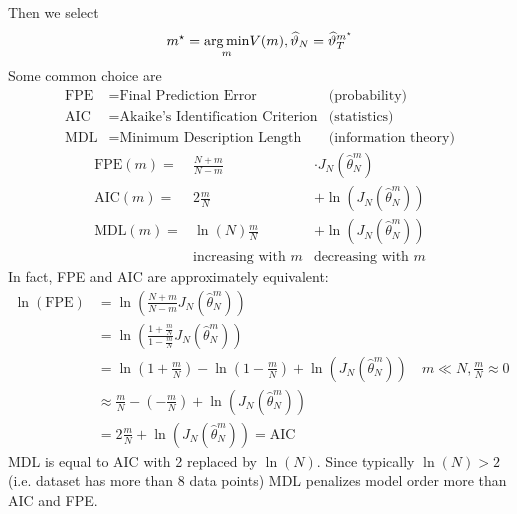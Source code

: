 Then we select
\begin{equation*}
m^{\star} =\underset{m}{\operatorname*{arg\,min}} V(m) ,\widehat{\vartheta }_{N} =\widehat{\vartheta }_{T}^{m^{\star}}
\end{equation*}
Some common choice are
\begin{align*}
\text{FPE} & =\text{Final Prediction Error} & \text{(probability)}\\
\text{AIC} & =\text{Akaike's Identification Criterion} & \text{(statistics)}\\
\text{MDL} & =\text{Minimum Description Length} & \text{(information theory)}
\end{align*}
\begin{equation*}
	\begin{array}{rcc}
		\text{FPE}(m) = & \frac{N+m}{N-m}          &  \cdot J_{N}\left(\hat{\theta }_{N}^{m}\right)\\
		\text{AIC}(m) = & 2\frac{m}{N}             &  +\ln\left(J_{N}(\hat{\theta }_{N}^{m})\right)\\
		\text{MDL}(m) = & \ln(N)\frac{m}{N}        &  +\ln\left(J_{N}(\hat{\theta }_{N}^{m})\right)\\
		                & \text{increasing with }m &  \text{decreasing with }m
	\end{array}
\end{equation*}
In fact, FPE and AIC are approximately equivalent:
\begin{align*}
\ln(\text{FPE}) & =\ln\left(\frac{N+m}{N-m} J_{N}(\hat{\theta }_{N}^{m})\right) \\
 & =\ln\left(\frac{1+\frac{m}{N}}{1-\frac{m}{N}} J_{N}(\hat{\theta }_{N}^{m})\right) \\
 & =\ln\left(1+\frac{m}{N}\right) -\ln\left(1-\frac{m}{N}\right) +\ln\left(J_{N}(\hat{\theta }_{N}^{m})\right) \quad m\ll N, \frac{m}{N} \approx 0\\
 & \approx \frac{m}{N} -\left(-\frac{m}{N}\right) +\ln\left(J_{N}(\hat{\theta }_{N}^{m})\right) \\
 & =2\frac{m}{N} +\ln\left(J_{N}(\hat{\theta }_{N}^{m})\right) = \text{AIC} & 
\end{align*}
MDL is equal to AIC with 2 replaced by $ \ln(N)$. Since typically $ \ln(N)  >2$ (i.e. dataset has more than 8 data points) MDL penalizes model order more than AIC and FPE.